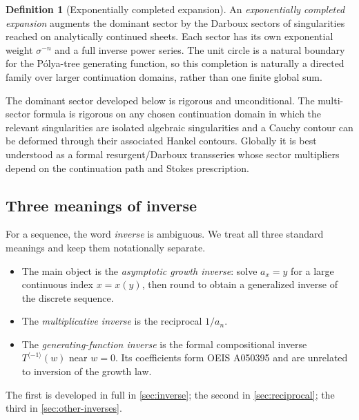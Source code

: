 \documentclass[11pt]{article}
\theoremstyle{definition}
\newtheorem{definition}[theorem]{Definition}
\theoremstyle{remark}
\newcommand{\invcomp}{\langle-1\rangle}
\begin{document}
\begin{definition}[Exponentially completed expansion]
An \emph{exponentially completed expansion} augments the dominant sector by
the Darboux sectors of singularities reached on analytically continued sheets.
Each sector has its own exponential weight $\sigma^{-n}$ and a full inverse
power series.  The unit circle is a natural boundary for the P\'olya-tree
generating function, so this completion is naturally a directed family over
larger continuation domains, rather than one finite global sum.
\end{definition}

The dominant sector developed below is rigorous and unconditional.  The
multi-sector formula is rigorous on any chosen continuation domain in which
the relevant singularities are isolated algebraic singularities and a Cauchy
contour can be deformed through their associated Hankel contours.  Globally it
is best understood as a formal resurgent/Darboux transseries whose sector
multipliers depend on the continuation path and Stokes prescription.

\subsection{Three meanings of inverse}

For a sequence, the word \emph{inverse} is ambiguous.  We treat all three
standard meanings and keep them notationally separate.
\begin{itemize}
\item The main object is the \emph{asymptotic growth inverse}: solve $a_x=y$
      for a large continuous index $x=x(y)$, then round to obtain a generalized
      inverse of the discrete sequence.
\item The \emph{multiplicative inverse} is the reciprocal $1/a_n$.
\item The \emph{generating-function inverse} is the formal compositional
      inverse $T^{\invcomp}(w)$ near $w=0$.  Its coefficients form OEIS
      A050395 and are unrelated to inversion of the growth law.
\end{itemize}
The first is developed in full in \cref{sec:inverse}; the second in
\cref{sec:reciprocal}; the third in \cref{sec:other-inverses}.
\end{document}
